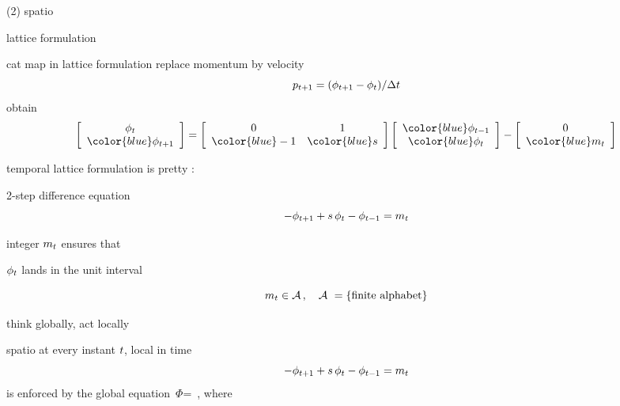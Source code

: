 \renewcommand{\Xx}{\ensuremath{\Phi}}

\begin{frame}{(2) {\color{orange}spatio}{\templatt}}
\vfill
\begin{center}
{\huge lattice formulation}
\end{center}
\vfill
\end{frame} %

\begin{frame}{cat map in lattice formulation}
replace momentum by velocity
\[
p_{t+1}=(\phi_{t+1}  - \phi_{t})/\Delta t
\]
obtain
 \[
 \left[\begin{array}{c}
   \ssp_{\zeit}  \\
   {\color{blue}\ssp_{\zeit+1}}
  \end{array} \right]=
  \left[
\begin{array}{cc}
0 & 1 \\
{\color{blue}-1} & {\color{blue}s} \\
\end{array}
    \right]
    \left[\begin{array}{c}
   {\color{blue}\ssp_{\zeit-1}}  \\
   {\color{blue}\ssp_{\zeit}}
  \end{array} \right]
 - \left[\begin{array}{c}
 0  \\
 {\color{blue}\Ssym{\zeit}}
 \end{array} \right]
 \] %

temporal lattice formulation %
is {\Large pretty} :
\begin{block}{2-step difference equation}
\[
- \phi_{t+1}  +  s \, \phi_{t} - \phi_{t-1} = {m_{t}}
\] %
\end{block}
integer ${m_{t}}$ ensures that

\hfill $\phi_{t}$ lands in the unit interval

\bigskip
\[
{m_{t}}\in  \mathcal{A}
\,,\quad \mathcal{A}\ = \{\mbox{finite alphabet}\}
\]
\end{frame} %

\begin{frame}{think globally, act locally}

{\color{orange}spatio}{\templatt} at every instant $t$,
{\color{blue}local} in time
\[
- \phi_{t+1}  +  s \, \phi_{t} - \phi_{t-1} = {m_{t}}
\] %
is enforced by the {\color{blue}global} equation
\beq
 \jMorb\,\Xx = \Mm
\,,
where
\end{frame} %

